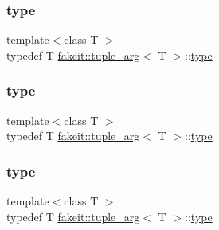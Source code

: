 \subsubsection{\texorpdfstring{type}{type}\hspace{0.1cm}{\footnotesize\ttfamily [4/9]}}
{\footnotesize\ttfamily template$<$class T $>$ \\
typedef T \mbox{\hyperlink{structfakeit_1_1tuple__arg}{fakeit\+::tuple\+\_\+arg}}$<$ T $>$\+::\mbox{\hyperlink{structfakeit_1_1tuple__arg_abaa55c1c51c4f37325b54def32256f1d}{type}}}

\mbox{\label{structfakeit_1_1tuple__arg_abaa55c1c51c4f37325b54def32256f1d}} 
\subsubsection{\texorpdfstring{type}{type}\hspace{0.1cm}{\footnotesize\ttfamily [5/9]}}
{\footnotesize\ttfamily template$<$class T $>$ \\
typedef T \mbox{\hyperlink{structfakeit_1_1tuple__arg}{fakeit\+::tuple\+\_\+arg}}$<$ T $>$\+::\mbox{\hyperlink{structfakeit_1_1tuple__arg_abaa55c1c51c4f37325b54def32256f1d}{type}}}

\mbox{\label{structfakeit_1_1tuple__arg_abaa55c1c51c4f37325b54def32256f1d}} 
\subsubsection{\texorpdfstring{type}{type}\hspace{0.1cm}{\footnotesize\ttfamily [6/9]}}
{\footnotesize\ttfamily template$<$class T $>$ \\
typedef T \mbox{\hyperlink{structfakeit_1_1tuple__arg}{fakeit\+::tuple\+\_\+arg}}$<$ T $>$\+::\mbox{\hyperlink{structfakeit_1_1tuple__arg_abaa55c1c51c4f37325b54def32256f1d}{type}}}

\mbox{\label{structfakeit_1_1tuple__arg_abaa55c1c51c4f37325b54def32256f1d}} 
